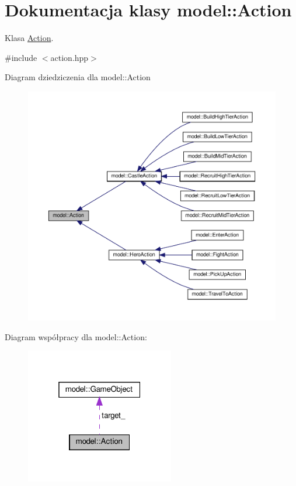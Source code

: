 \hypertarget{classmodel_1_1Action}{}\section{Dokumentacja klasy model\+:\+:Action}
\label{classmodel_1_1Action}


Klasa \hyperlink{classmodel_1_1Action}{Action}.  




{\ttfamily \#include $<$action.\+hpp$>$}



Diagram dziedziczenia dla model\+:\+:Action\nopagebreak
\begin{figure}[H]
\begin{center}
\leavevmode
\includegraphics[width=350pt]{classmodel_1_1Action__inherit__graph}
\end{center}
\end{figure}


Diagram współpracy dla model\+:\+:Action\+:\nopagebreak
\begin{figure}[H]
\begin{center}
\leavevmode
\includegraphics[width=184pt]{classmodel_1_1Action__coll__graph}
\end{center}
\end{figure}

